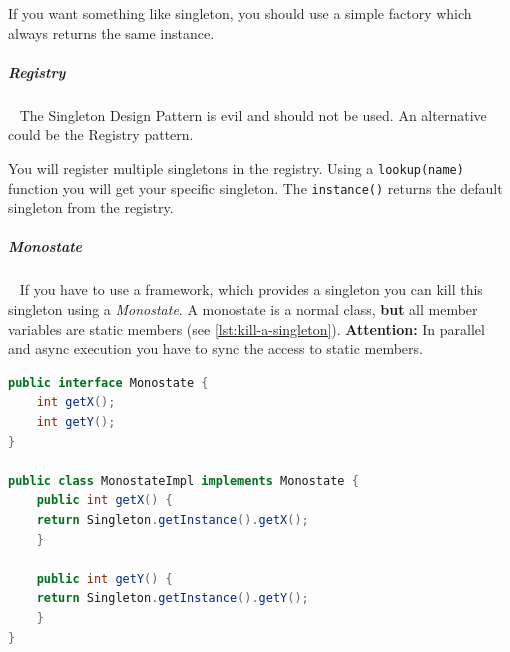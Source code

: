 \documentclass[8pt,twoside,landscape]{extarticle}
\begin{document}
\begin{multicols}{4}
If you want something like singleton, you should use a simple factory which always returns the same instance.

\subparagraph{Registry} \
\label{sec:orgf972b86}
The Singleton Design Pattern is evil and should not be used.
An alternative could be the Registry pattern.

You will register multiple singletons in the registry.
Using a \texttt{lookup(name)} function you will get your specific singleton.
The \texttt{instance()} returns the default singleton from the registry.

\subparagraph{Monostate} \
\label{sec:orgef9a99d}
If you have to use a framework, which provides a singleton you can kill this singleton using a \emph{Monostate}.
A monostate is a normal class, \textbf{but} all member variables are static members (see \autoref{lst:kill-a-singleton}).
\textbf{Attention:} In parallel and async execution you have to sync the access to static members.


\begin{lstlisting}[language=java,label=lst:kill-a-singleton,caption={Kill a singleton},captionpos=b,numbers=none]
public interface Monostate {
    int getX();
    int getY();
}

public class MonostateImpl implements Monostate {
    public int getX() {
	return Singleton.getInstance().getX();
    }

    public int getY() {
	return Singleton.getInstance().getY();
    }
}
\end{lstlisting}


\end{multicols}
\end{document}
